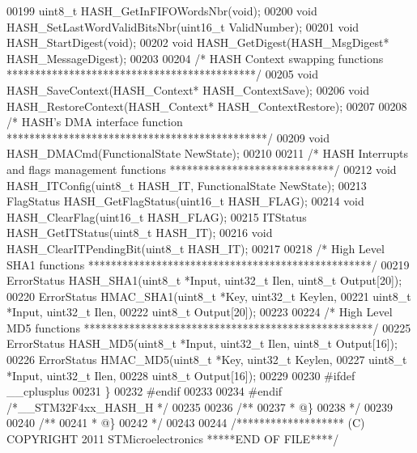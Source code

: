 \begin{DoxyCode}
00199 uint8\_t HASH_GetInFIFOWordsNbr(\textcolor{keywordtype}{void});
00200 \textcolor{keywordtype}{void} HASH_SetLastWordValidBitsNbr(uint16\_t ValidNumber);
00201 \textcolor{keywordtype}{void} HASH_StartDigest(\textcolor{keywordtype}{void});
00202 \textcolor{keywordtype}{void} HASH_GetDigest(HASH\_MsgDigest* HASH\_MessageDigest);
00203 
00204 \textcolor{comment}{/* HASH Context swapping functions ********************************************/}
00205 \textcolor{keywordtype}{void} HASH_SaveContext(HASH\_Context* HASH\_ContextSave);
00206 \textcolor{keywordtype}{void} HASH_RestoreContext(HASH\_Context* HASH\_ContextRestore);
00207 
00208 \textcolor{comment}{/* HASH's DMA interface function **********************************************/}
00209 \textcolor{keywordtype}{void} HASH_DMACmd(FunctionalState NewState);
00210 
00211 \textcolor{comment}{/* HASH Interrupts and flags management functions *****************************/}
00212 \textcolor{keywordtype}{void} HASH_ITConfig(uint8\_t HASH\_IT, FunctionalState NewState);
00213 FlagStatus HASH_GetFlagStatus(uint16\_t HASH\_FLAG);
00214 \textcolor{keywordtype}{void} HASH_ClearFlag(uint16\_t HASH\_FLAG);
00215 ITStatus HASH_GetITStatus(uint8\_t HASH\_IT);
00216 \textcolor{keywordtype}{void} HASH_ClearITPendingBit(uint8\_t HASH\_IT);
00217 
00218 \textcolor{comment}{/* High Level SHA1 functions **************************************************/}
00219 ErrorStatus HASH_SHA1(uint8\_t *Input, uint32\_t Ilen, uint8\_t Output[20]);
00220 ErrorStatus HMAC_SHA1(uint8\_t *Key, uint32\_t Keylen,
00221                       uint8\_t *Input, uint32\_t Ilen,
00222                       uint8\_t Output[20]);
00223 
00224 \textcolor{comment}{/* High Level MD5 functions ***************************************************/}
00225 ErrorStatus HASH_MD5(uint8\_t *Input, uint32\_t Ilen, uint8\_t Output[16]);
00226 ErrorStatus HMAC_MD5(uint8\_t *Key, uint32\_t Keylen,
00227                      uint8\_t *Input, uint32\_t Ilen,
00228                      uint8\_t Output[16]);
00229 
00230 \textcolor{preprocessor}{#}\textcolor{preprocessor}{ifdef} \_\_cplusplus
00231 \}
00232 \textcolor{preprocessor}{#}\textcolor{preprocessor}{endif}
00233 
00234 \textcolor{preprocessor}{#}\textcolor{preprocessor}{endif} \textcolor{comment}{/*\_\_STM32F4xx\_HASH\_H */}
00235 
00236 \textcolor{comment}{/**}
00237 \textcolor{comment}{  * @\}}
00238 \textcolor{comment}{  */}
00239 
00240 \textcolor{comment}{/**}
00241 \textcolor{comment}{  * @\}}
00242 \textcolor{comment}{  */}
00243 
00244 \textcolor{comment}{/******************* (C) COPYRIGHT 2011 STMicroelectronics *****END OF FILE****/}
\end{DoxyCode}
